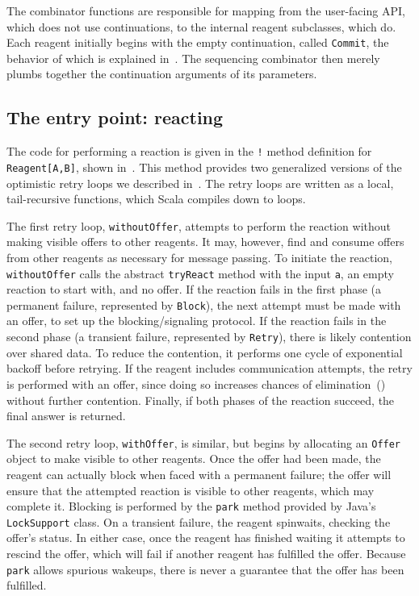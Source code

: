 \documentclass[preprint,nocopyrightspace]{sigplanconf}
\begin{document}
The combinator functions are responsible for mapping from the user-facing API,
which does not use continuations, to the internal reagent subclasses, which do.
Each reagent initially begins with the empty continuation, called
\lstinline{Commit}, the behavior of which is explained in~.
The sequencing combinator then merely plumbs together the continuation arguments
of its parameters.

\subsection{The entry point: reacting}
\label{sec:impl-reaction}

The code for performing a reaction is given in the \lstinline{!} method
definition for \lstinline{Reagent[A,B]}, shown in~.  This
method provides two generalized versions of the optimistic retry loops we
described in~.  The retry loops are written as a local,
tail-recursive functions, which Scala compiles down to loops.

The first retry loop, \lstinline{withoutOffer}, attempts to perform the
reaction without making visible offers to other reagents.  It may, however,
find and consume offers from other reagents as necessary for message passing.
To initiate the reaction, \lstinline{withoutOffer} calls the abstract
\lstinline{tryReact} method with the input \lstinline{a}, an empty reaction to
start with, and no offer.  If the reaction fails in the first phase (a
permanent failure, represented by \lstinline{Block}), the next attempt must be
made with an offer, to set up the blocking/signaling protocol.  If the
reaction fails in the second phase (a transient failure, represented by
\lstinline{Retry}), there is likely contention over shared data.  To reduce
the contention, it performs one cycle of exponential backoff before retrying.
If the reagent includes communication attempts, the retry is performed with an
offer, since doing so increases chances of elimination~()
without further contention.  Finally, if both phases of the reaction succeed,
the final answer is returned.

The second retry loop, \lstinline{withOffer}, is similar, but begins by
allocating an \lstinline{Offer} object to make visible to other reagents.  Once
the offer had been made, the reagent can actually block when faced with a
permanent failure; the offer will ensure that the attempted reaction is visible
to other reagents, which may complete it.  Blocking is performed by the
\lstinline{park} method provided by Java's \lstinline{LockSupport} class.  On a
transient failure, the reagent spinwaits, checking the offer's status.  In
either case, once the reagent has finished waiting it attempts to rescind the
offer, which will fail if another reagent has fulfilled the offer.  Because
\lstinline{park} allows spurious wakeups, there is never a guarantee that the
offer has been fulfilled.
\end{document}
